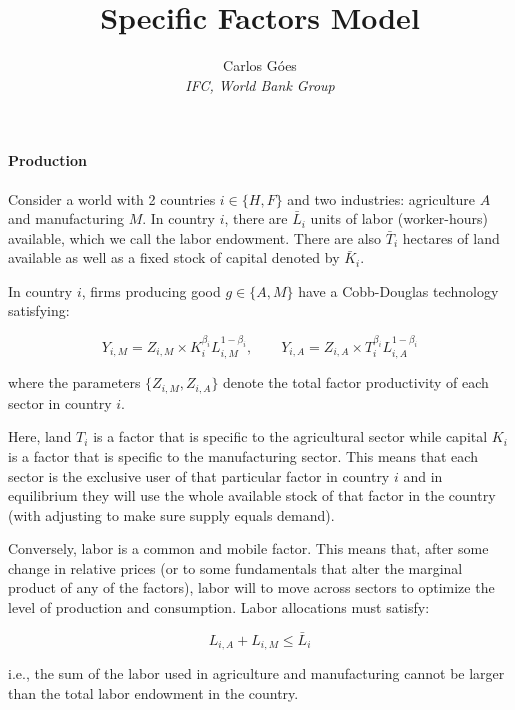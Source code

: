 \documentclass[11pt,letterpaper]{article}
\begin{document}
\title{\textbf{Specific Factors Model}}
\author{\large%
\setcounter{footnote}{0}%
Carlos G\'{o}es \\[-3pt] \textit{\small IFC, World Bank Group}
}
\maketitle

\paragraph{Production} Consider a world with 2 countries $i \in \{ H, F\}$ and two industries: agriculture $A$ and manufacturing $M$. In country $i$, there are $\bar{L}_i$ units of labor (worker-hours) available, which we call the labor endowment. There are also $\bar{T}_i$ hectares of land available as well as a fixed stock of capital denoted by $\bar{K}_i$.

In country $i$, firms producing good $g \in \{ A,M\}$ have a Cobb-Douglas technology satisfying:

\begin{equation*}
 Y_{i,M} = Z_{i,M} \times K_{i}^{\beta_i} L_{i,M}^{1-\beta_i}, \qquad  Y_{i,A} = Z_{i,A} \times T_{i}^{\beta_i} L_{i,A}^{1-\beta_i}
\end{equation*}

\noindent where the parameters $\{ Z_{i,M}, Z_{i,A}\}$ denote the total factor productivity of each sector in country $i$.

Here, land $T_i$ is a factor that is specific to the agricultural sector while capital $K_i$ is a factor that is specific to the manufacturing sector. This means that each sector is the exclusive user of that particular factor in country $i$ and in equilibrium they will use the whole available stock of that factor in the country (with adjusting to make sure supply equals demand).

Conversely, labor is a common and mobile factor. This means that, after some change in relative prices (or to some fundamentals that alter the marginal product of any of the factors), labor will to move across sectors to optimize the level of production and consumption. Labor allocations must satisfy:

\begin{equation*}
    L_{i,A} + L_{i,M} \le \bar{L}_i
\end{equation*}

\noindent i.e., the sum of the labor used in agriculture and manufacturing cannot be larger than the total labor endowment in the country.
\end{document}
